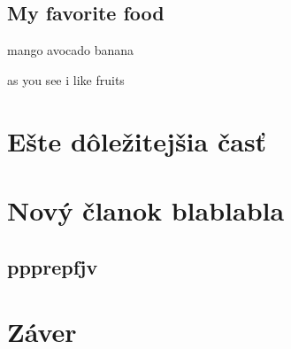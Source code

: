 \documentclass[10pt,twoside,english,a4paper]{article}
\begin{document}
\subsection{My favorite food}
mango
avocado
banana

as you see i like fruits
\section{Ešte dôležitejšia časť} \label{dolezitejsia}


\section{Nový članok blablabla}
\subsection{ppprepfjv}



\section{Záver} \label{zaver} %






\end{document}
